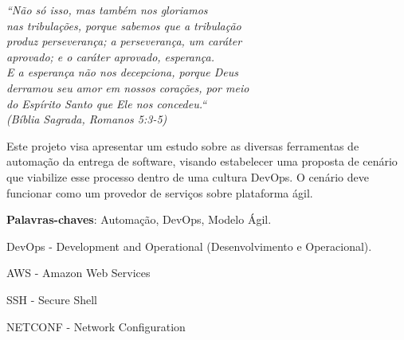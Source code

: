 \begin{epigrafe}
    \vspace*{\fill}
	\begin{flushright}
		\textit{``Não só isso, mas também nos gloriamos \\
			nas tribulações, porque sabemos que a tribulação\\
			produz perseverança; a perseverança, um caráter \\
			aprovado; e o caráter aprovado, esperança. \\
			E a esperança não nos decepciona, porque Deus \\
			derramou seu amor em nossos corações, por meio \\
			do Espírito Santo que Ele nos concedeu.``\\
			(Bíblia Sagrada, Romanos 5:3-5)}
			
	\end{flushright}
\end{epigrafe}


\setlength{\absparsep}{18pt} %
\begin{resumo}
Este projeto visa apresentar um estudo sobre as diversas ferramentas de automação da entrega de software, visando estabelecer uma proposta de cenário que viabilize esse processo dentro de uma cultura DevOps. O cenário deve funcionar como um provedor de serviços sobre plataforma ágil.
 

 \textbf{Palavras-chaves}: Automação, DevOps, Modelo Ágil.
 
\end{resumo}




\listoffigures*


\begin{siglas}
  \item DevOps - Development and Operational (Desenvolvimento e Operacional).
  \item AWS - Amazon Web Services
  \item SSH - Secure Shell
  \item NETCONF - Network Configuration
\end{siglas}


\tableofcontents*
\cleardoublepage

